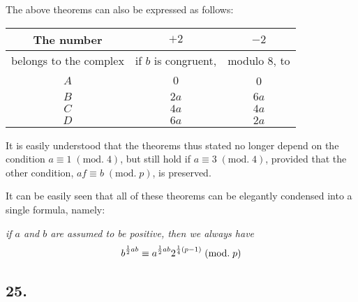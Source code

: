\documentclass[twoside,12pt]{memoir}
\renewcommand{\pmod}[1]{\;(\textrm{mod.}\;#1)}
\let\oldfrac\frac
\def\frac#1#2{\mathchoice{\tfrac{#1}{#2}}{\oldfrac{#1}{#2}}{\genfrac{}{}{}{2}{#1}{#2\mathstrut}}{\genfrac{}{}{}{3}{#1}{#2\mathstrut}}}
\begin{document}
The above theorems can also be expressed as follows:
\begin{center}
\begin{tabular}{c|c|c}
The number & \(+2\) & \(-2\) \\
\hline
belongs to the complex & \multicolumn{1}{r}{if \(b\) is congruent,}&\multicolumn{1}{l}{modulo \(8\), to } \\
\hline
\(A\) & \(0\) & 0 \\
\(B\) & \(2 a\) & \(6 a\) \\
\(C\) & \(4 a\) & \(4 a\) \\
\(D\) & \(6 a\) & \(2 a\) \\
\end{tabular}
\end{center}
It is easily understood that the theorems thus stated no longer depend on the condition \(a \equiv 1\pmod{4}\), but still hold if \(a \equiv 3\pmod{4}\), provided that the other condition, \(a f \equiv b\pmod{p}\), is preserved.
%

It can be easily seen that all of these theorems can be elegantly condensed into a single formula, namely:
 
\textit{if \(a\) and \(b\) are assumed to be positive, then we always have}
\[b^{\frac{1}{2} a b} \equiv a^{\frac{1}{2} a b} 2^{\frac{1}{4}(p-1)}\pmod{p}\]
%

\subsection*{25.}
\end{document}
